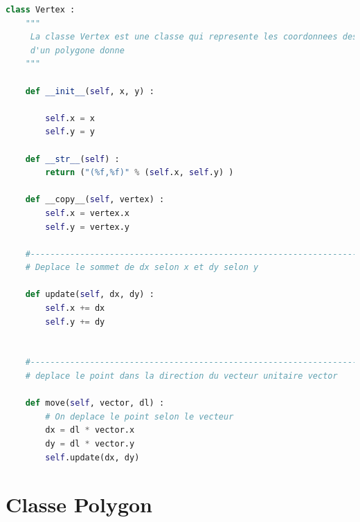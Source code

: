 \documentclass[a4paper,reqno]{article}
\begin{document}
\begin{lstlisting}[language=Python,frame=single,caption=Création d'une classe Vertex]
class Vertex : 
    """
     La classe Vertex est une classe qui represente les coordonnees des points 
     d'un polygone donne 
    """
    
    def __init__(self, x, y) : 
        
        self.x = x 
        self.y = y 
    
    def __str__(self) : 
        return ("(%f,%f)" % (self.x, self.y) )
    
    def __copy__(self, vertex) : 
        self.x = vertex.x 
        self.y = vertex.y 
    
    #---------------------------------------------------------------------    
    # Deplace le sommet de dx selon x et dy selon y 
    
    def update(self, dx, dy) : 
        self.x += dx 
        self.y += dy 
        
        
    #---------------------------------------------------------------------   
    # deplace le point dans la direction du vecteur unitaire vector 
    
    def move(self, vector, dl) : 
        # On deplace le point selon le vecteur
        dx = dl * vector.x 
        dy = dl * vector.y 
        self.update(dx, dy) 
\end{lstlisting}


\section*{Classe Polygon}
\end{document}

